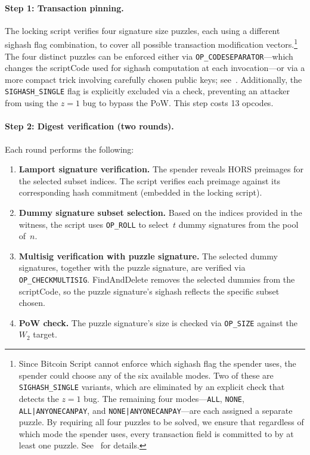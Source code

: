 \documentclass[11pt, a4paper]{article}
\begin{document}
\paragraph{Step 1: Transaction pinning.}
The locking script verifies four signature size puzzles, each using a different sighash flag combination, to cover all possible transaction modification vectors.\footnote{Since Bitcoin Script cannot enforce which sighash flag the spender uses, the spender could choose any of the six available modes. Two of these are \texttt{SIGHASH\_SINGLE} variants, which are eliminated by an explicit check that detects the $z = 1$ bug. The remaining four modes---\texttt{ALL}, \texttt{NONE}, \texttt{ALL|ANYONECANPAY}, and \texttt{NONE|ANYONECANPAY}---are each assigned a separate puzzle. By requiring all four puzzles to be solved, we ensure that regardless of which mode the spender uses, every transaction field is committed to by at least one puzzle. See~\cite[Section~5]{linus2024binohash} for details.} The four distinct puzzles can be enforced either via \texttt{OP\_CODESEPARATOR}---which changes the scriptCode used for sighash computation at each invocation---or via a more compact trick involving carefully chosen public keys; see~\cite[Appendix~A]{linus2024binohash}. Additionally, the \texttt{SIGHASH\_SINGLE} flag is explicitly excluded via a check, preventing an attacker from using the $z = 1$ bug to bypass the PoW. This step costs 13 opcodes.

\paragraph{Step 2: Digest verification (two rounds).}
Each round performs the following:

\begin{enumerate}
    \item \textbf{Lamport signature verification.} The spender reveals HORS preimages for the selected subset indices. The script verifies each preimage against its corresponding hash commitment (embedded in the locking script).

    \item \textbf{Dummy signature subset selection.} Based on the indices provided in the witness, the script uses \texttt{OP\_ROLL} to select~$t$ dummy signatures from the pool of~$n$.

    \item \textbf{Multisig verification with puzzle signature.} The selected dummy signatures, together with the puzzle signature, are verified via \texttt{OP\_CHECKMULTISIG}. FindAndDelete removes the selected dummies from the scriptCode, so the puzzle signature's sighash reflects the specific subset chosen.

    \item \textbf{PoW check.} The puzzle signature's size is checked via \texttt{OP\_SIZE} against the~$W_2$ target.
\end{enumerate}
\end{document}
